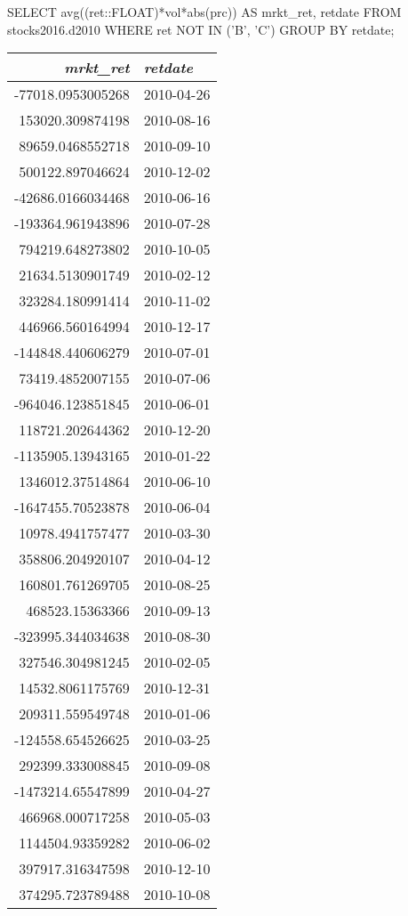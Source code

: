 SELECT avg((ret::FLOAT)*vol*abs(prc)) AS mrkt_ret, retdate
FROM stocks2016.d2010
WHERE ret NOT IN ('B', 'C')
GROUP BY retdate;
\begin{tabular}{r | l}
\textit{mrkt\_ret} & \textit{retdate} \\
\hline
-77018.0953005268 & 2010-04-26 \\
153020.309874198 & 2010-08-16 \\
89659.0468552718 & 2010-09-10 \\
500122.897046624 & 2010-12-02 \\
-42686.0166034468 & 2010-06-16 \\
-193364.961943896 & 2010-07-28 \\
794219.648273802 & 2010-10-05 \\
21634.5130901749 & 2010-02-12 \\
323284.180991414 & 2010-11-02 \\
446966.560164994 & 2010-12-17 \\
-144848.440606279 & 2010-07-01 \\
73419.4852007155 & 2010-07-06 \\
-964046.123851845 & 2010-06-01 \\
118721.202644362 & 2010-12-20 \\
-1135905.13943165 & 2010-01-22 \\
1346012.37514864 & 2010-06-10 \\
-1647455.70523878 & 2010-06-04 \\
10978.4941757477 & 2010-03-30 \\
358806.204920107 & 2010-04-12 \\
160801.761269705 & 2010-08-25 \\
468523.15363366 & 2010-09-13 \\
-323995.344034638 & 2010-08-30 \\
327546.304981245 & 2010-02-05 \\
14532.8061175769 & 2010-12-31 \\
209311.559549748 & 2010-01-06 \\
-124558.654526625 & 2010-03-25 \\
292399.333008845 & 2010-09-08 \\
-1473214.65547899 & 2010-04-27 \\
466968.000717258 & 2010-05-03 \\
1144504.93359282 & 2010-06-02 \\
397917.316347598 & 2010-12-10 \\
374295.723789488 & 2010-10-08 \\

\end{tabular}

